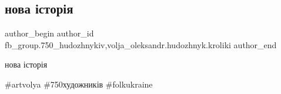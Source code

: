  
 
 
 
 

\subsection{нова історія}
\label{sec:12_03_2018.fb.fb_group.750_hudozhnykiv.1.nova_istoria}
 
\ifcmt
 author_begin
   author_id fb_group.750_hudozhnykiv,volja_oleksandr.hudozhnyk.kroliki
 author_end
\fi

нова історія🐇

\#artvolya \#750художників \#folkukraine

